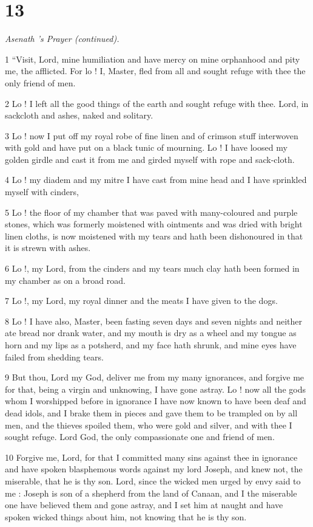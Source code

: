 \chapter{13}

\par \textit{Asenath 's Prayer (continued).}

1 “Visit, Lord, mine humiliation and have mercy on mine orphanhood and pity me, the afflicted. For lo ! I, Master, fled from all and sought refuge with thee the only friend of men. 

2 Lo ! I left all the good things of the earth and sought refuge with thee. Lord, in sackcloth and ashes, naked and solitary. 

3 Lo ! now I put off my royal robe of fine linen and of crimson stuff interwoven with gold and have put on a black tunic of mourning. Lo ! I have loosed my golden girdle and cast it from me and girded myself with rope and sack-cloth. 

4 Lo ! my diadem and my mitre I have cast from mine head and I have sprinkled myself with cinders, 

5 Lo ! the floor of my chamber that was paved with many-coloured and purple stones, which was formerly moistened with ointments and was dried with bright linen cloths, is now moistened with my tears and hath been dishonoured in that it is strewn with ashes. 

6 Lo !, my Lord, from the cinders and my tears much clay hath been formed in my chamber as on a broad road. 

7 Lo !, my Lord, my royal dinner and the meats I have given to the dogs. 

8 Lo ! I have also, Master, been fasting seven days and seven nights and neither ate bread nor drank water, and my mouth is dry as a wheel and my tongue as horn and my lips as a potsherd, and my face hath shrunk, and mine eyes have failed from shedding tears. 

9 But thou, Lord my God, deliver me from my many ignorances, and forgive me for that, being a virgin and unknowing, I have gone astray. Lo ! now all the gods whom I worshipped before in ignorance I have now known to have been deaf and dead idols, and I brake them in pieces and gave them to be trampled on by all men, and the thieves spoiled them, who were gold and silver, and with thee I sought refuge. Lord God, the only compassionate one and friend of men. 

10 Forgive me, Lord, for that I committed many sins against thee in ignorance and have spoken blasphemous words against my lord Joseph, and knew not, the miserable, that he is thy son. Lord, since the wicked men urged by envy said to me : Joseph is son of a shepherd from the land of Canaan, and I the miserable one have believed them and gone astray, and I set him at naught and have spoken wicked things about him, not knowing that he is thy son. 

